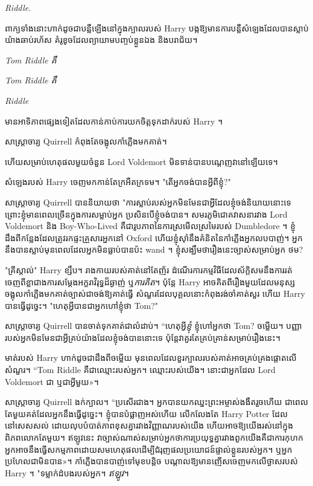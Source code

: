
 \emph{Riddle.}

\hplettrineextrapara
ពាក្យ​ទាំង​នោះ​ហាក់​ដូច​ជា​បន្លឺ​ឡើង​នៅ​ក្នុង​ក្បាល​របស់ Harry បង្ក​ឱ្យ​មាន​ការ​បន្លឺ​សំឡេង​ដែល​បាន​ស្លាប់​យ៉ាង​ឆាប់​រហ័ស គំរូ​ខូច​ដែល​ព្យាយាម​បញ្ចប់​ខ្លួន​ឯង និង​បរាជ័យ។

\emph{Tom Riddle គឺ}

\emph{Tom Riddle គឺ}

\emph{Riddle}

មានអាទិភាពផ្សេងទៀតដែលកាន់កាប់ការយកចិត្តទុកដាក់របស់ Harry ។

សាស្ត្រាចារ្យ Quirrell កំពុង​តែ​ចង្អុល​កាំភ្លើង​មក​គាត់។

ហើយសម្រាប់ហេតុផលមួយចំនួន Lord Voldemort មិនទាន់បានបណ្តេញវានៅឡើយទេ។

សំឡេង​របស់ Harry ចេញ​មក​កាន់​តែ​ក្រអឺតក្រទម។ "តើអ្នកចង់បានអ្វីពីខ្ញុំ?"

សាស្ត្រាចារ្យ Quirrell បាននិយាយថា "ការស្លាប់របស់អ្នកមិនមែនជាអ្វីដែលខ្ញុំចង់និយាយនោះទេ ព្រោះខ្ញុំមានពេលច្រើនក្នុងការសម្លាប់អ្នក ប្រសិនបើខ្ញុំចង់បាន។ សមរភូមិជោគវាសនារវាង Lord Voldemort និង Boy-Who-Lived គឺជារូបភាពនៃការស្រមើលស្រមៃរបស់ Dumbledore ។ ខ្ញុំដឹងពីកន្លែងដែលត្រូវរកផ្ទះគ្រួសារអ្នកនៅ Oxford ហើយខ្ញុំស៊ាំនឹងគំនិតនៃកាំភ្លើងអ្នកលបបាញ់។ អ្នក​នឹង​បាន​ស្លាប់​មុន​ពេល​ដែល​អ្នក​មិន​ធ្លាប់​បាន​ប៉ះ wand ។ ខ្ញុំ​សង្ឃឹម​ថា​រឿង​នេះ​ច្បាស់​សម្រាប់​អ្នក ថម?

"គ្រីស្តាល់" Harry ខ្សឹប។ រាងកាយរបស់គាត់នៅតែញ័រ ដំណើរការកម្មវិធីដែលស័ក្តិសមនឹងការរត់ចេញពីខ្លាជាងការសម្ដែងអក្ខរាវិរុទ្ធដ៏ឆ្ងាញ់ ឬ\emph{ការគិត}។ ប៉ុន្តែ Harry អាចគិតពីរឿងមួយដែលមនុស្សចង្អុលកាំភ្លើងមកគាត់ច្បាស់ជាចង់ឱ្យគាត់ធ្វើ សំណួរដែលបុគ្គលនោះកំពុងរង់ចាំគាត់សួរ ហើយ Harry បានធ្វើដូច្នេះ។ "ហេតុអ្វីបានជាអ្នកហៅខ្ញុំថា Tom?"

សាស្រ្តាចារ្យ Quirrell បានចាត់ទុកគាត់ជាលំដាប់។ “ហេតុអ្វី\emph{ខ្ញុំ} ខ្ញុំហៅអ្នកថា Tom? ចម្លើយ។ បញ្ញារបស់អ្នកមិនមែនជាអ្វីគ្រប់យ៉ាងដែលខ្ញុំចង់បាននោះទេ ប៉ុន្តែវាគួរតែគ្រប់គ្រាន់សម្រាប់រឿងនេះ។

មាត់របស់ Harry ហាក់ដូចជាដឹងពីចម្លើយ មុនពេលដែលខួរក្បាលរបស់គាត់អាចគ្រប់គ្រងផ្តោតលើសំណួរ។ “Tom Riddle គឺជាឈ្មោះរបស់អ្នក។ ឈ្មោះរបស់យើង។ នោះ​ជា​អ្នក​ដែល Lord Voldemort ជា ឬ​ជា​អ្វី​មួយ»។

សាស្ត្រាចារ្យ Quirrell ងក់ក្បាល។ “ប្រសើរជាង។ អ្នក​បាន​យក​ឈ្នះ​ព្រះអម្ចាស់​ងងឹត​រួច​ហើយ ជា​ពេល​តែ​មួយ​គត់​ដែល​អ្នក​នឹង​ធ្វើ​ដូច្នេះ។ ខ្ញុំបានបំផ្លាញអស់ហើយ លើកលែងតែ Harry Potter ដែលនៅសេសសល់ ដោយលុបបំបាត់ភាពខុសគ្នារវាងវិញ្ញាណរបស់យើង ហើយអាចឱ្យយើងរស់នៅក្នុងពិភពលោកតែមួយ។ ឥឡូវនេះ វាច្បាស់ណាស់សម្រាប់អ្នកថាការប្រយុទ្ធគ្នារវាងពួកយើងគឺជាការកុហក អ្នកអាចនឹងធ្វើសកម្មភាពដោយសមហេតុផលដើម្បីជំរុញផលប្រយោជន៍ផ្ទាល់ខ្លួនរបស់អ្នក។ ឬ​អ្នក​ប្រហែល​ជា​មិន​បាន​»។ កាំភ្លើង​បាន​បាញ់​ទៅ​មុខ​បន្តិច បណ្តាល​ឱ្យ​មាន​ញើស​ចេញ​មក​លើ​ថ្ងាស​របស់ Harry ។ "ទម្លាក់ដំបងរបស់អ្នក។ \emph{ឥឡូវ}។

